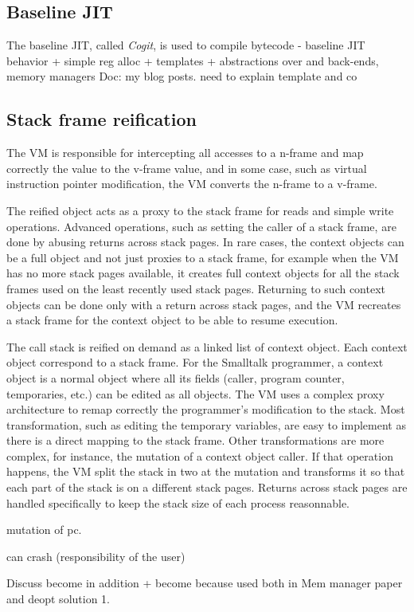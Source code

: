\documentclass[a4paper,12pt,twoside]{../includes/ThesisStyle}
\begin{document}
\subsection{Baseline JIT}

The baseline JIT, called \emph{Cogit}, is used to compile bytecode
- baseline JIT behavior + simple reg alloc + templates + abstractions over and back-ends, memory managers
Doc: my blog posts. need to explain template and co

\subsection{Stack frame reification}


The VM is responsible for intercepting all accesses to a n-frame and map correctly the value to the v-frame value, and in some case, such as virtual instruction pointer modification, the VM converts the n-frame to a v-frame.


The reified object acts as a proxy to the stack frame for reads and simple write operations. Advanced operations, such as setting the caller of a stack frame, are done by abusing returns across stack pages. In rare cases, the context objects can be a full object and not just proxies to a stack frame, for example 
when the VM has no more stack pages available, it creates full context objects for all the stack frames used on the least recently used stack pages. Returning to such context objects can be done only with a return across stack pages, and the VM recreates a stack frame for the context object to be able to resume execution.

The call stack is reified on demand as a linked list of context object. Each context object correspond to a stack frame. For the Smalltalk programmer, a context object is a normal object where all its fields (caller, program counter, temporaries, etc.) can be edited as all objects. The VM uses a complex proxy architecture to remap correctly the programmer's modification to the stack. Most transformation, such as editing the temporary variables, are easy to implement as there is a direct mapping to the stack frame. Other transformations are more complex, for instance, the mutation of a context object caller. If that operation happens, the VM split the stack in two at the mutation and transforms it so that each part of the stack is on a different stack pages. Returns across stack pages are handled specifically to keep the stack size of each process reasonnable.

mutation of pc.

can crash (responsibility of the user)



Discuss become in addition
+ become because used both in Mem manager paper and deopt solution 1.

\ifx\wholebook\relax\else
    
\end{document}
